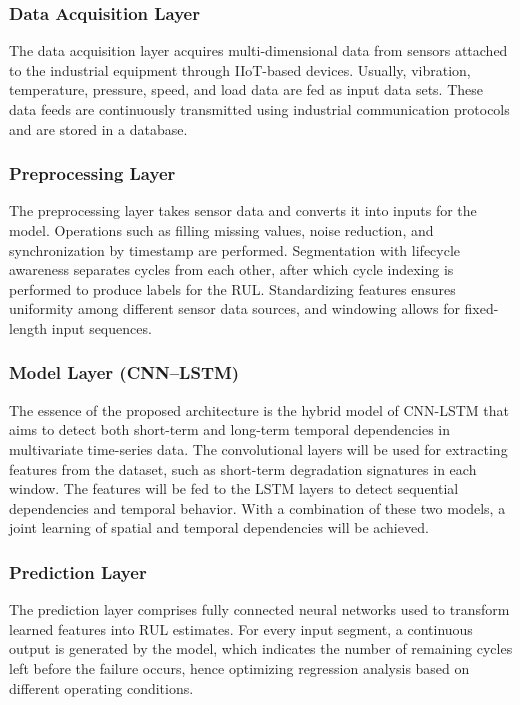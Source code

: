 \documentclass[conference]{IEEEtran}
\begin{document}
\subsubsection{Data Acquisition Layer}
The data acquisition layer acquires multi-dimensional data from sensors attached to the industrial equipment through IIoT-based devices. Usually, vibration, temperature, pressure, speed, and load data are fed as input data sets. These data feeds are continuously transmitted using industrial communication protocols and are stored in a database.

\subsubsection{Preprocessing Layer}
The preprocessing layer takes sensor data and converts it into inputs for the model. Operations such as filling missing values, noise reduction, and synchronization by timestamp are performed. Segmentation with lifecycle awareness separates cycles from each other, after which cycle indexing is performed to produce labels for the RUL. Standardizing features ensures uniformity among different sensor data sources, and windowing allows for fixed-length input sequences.

\subsubsection{Model Layer (CNN--LSTM)}
The essence of the proposed architecture is the hybrid model of CNN-LSTM that aims to detect both short-term and long-term temporal dependencies in multivariate time-series data. The convolutional layers will be used for extracting features from the dataset, such as short-term degradation signatures in each window. The features will be fed to the LSTM layers to detect sequential dependencies and temporal behavior. With a combination of these two models, a joint learning of spatial and temporal dependencies will be achieved.

\subsubsection{Prediction Layer}
The prediction layer comprises fully connected neural networks used to transform learned features into RUL estimates. For every input segment, a continuous output is generated by the model, which indicates the number of remaining cycles left before the failure occurs, hence optimizing regression analysis based on different operating conditions.
\end{document}
